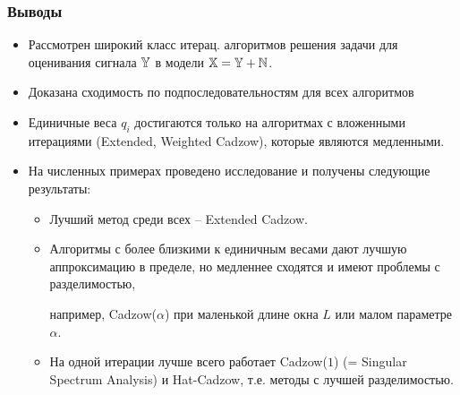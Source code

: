 \documentclass[unicode, notheorems]{beamer}
\begin{document}
%  


\begin{frame}
\frametitle{Выводы}\footnotesize
\begin{itemize}
	\item Рассмотрен широкий класс итерац. алгоритмов решения задачи 
	для оценивания сигнала $\mathbb{Y}$  в модели $\mathbb{X} = \mathbb{Y} + \mathbb{N}$.
	\item Доказана сходимость по подпоследовательностям для всех алгоритмов
	\item Единичные веса $q_i$ достигаются только на алгоритмах с вложенными итерациями (Extended, Weighted Cadzow), которые являются медленными.
	\item  На численных примерах проведено исследование и получены следующие результаты:
	\begin{itemize} \footnotesize
		\item Лучший метод среди всех -- Extended Cadzow.
		\item Алгоритмы с более близкими к единичным весами дают лучшую аппроксимацию в пределе, но медленнее сходятся и имеют проблемы с разделимостью,
		
		например, Cadzow($\alpha$) при маленькой  длине окна $L$ или малом параметре $\alpha$.
		\item На одной итерации лучше всего работает Cadzow($1$) (= Singular Spectrum Analysis) и Hat-Cadzow, т.е. методы с лучшей разделимостью.
	\end{itemize}
\end{itemize}

\end{frame}
\end{document}
